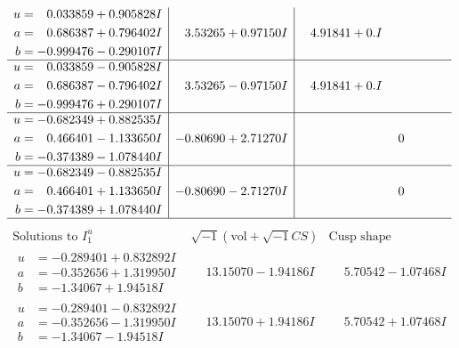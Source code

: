 \documentclass[1p]{elsarticle_modified}
\theoremstyle{definition}
\newcommand{\I}{\sqrt{-1}}
\begin{document}
$$\begin{array}{c|c|c}
\begin{aligned}
u &= \phantom{-}0.033859 + 0.905828 I \\
a &= \phantom{-}0.686387 + 0.796402 I \\
b &= -0.999476 - 0.290107 I\end{aligned}
 & \phantom{-}3.53265 + 0.97150 I & \phantom{-}4.91841 + 0. I\phantom{ +0.000000I} \\ \hline\begin{aligned}
u &= \phantom{-}0.033859 - 0.905828 I \\
a &= \phantom{-}0.686387 - 0.796402 I \\
b &= -0.999476 + 0.290107 I\end{aligned}
 & \phantom{-}3.53265 - 0.97150 I & \phantom{-}4.91841 + 0. I\phantom{ +0.000000I} \\ \hline\begin{aligned}
u &= -0.682349 + 0.882535 I \\
a &= \phantom{-}0.466401 - 1.133650 I \\
b &= -0.374389 - 1.078440 I\end{aligned}
 & -0.80690 + 2.71270 I & \phantom{-0.000000 } 0 \\ \hline\begin{aligned}
u &= -0.682349 - 0.882535 I \\
a &= \phantom{-}0.466401 + 1.133650 I \\
b &= -0.374389 + 1.078440 I\end{aligned}
 & -0.80690 - 2.71270 I & \phantom{-0.000000 } 0\\
 \hline 
 \end{array}$$\newpage$$\begin{array}{c|c|c}  
\text{Solutions to }I^u_{1}& \I (\text{vol} + \sqrt{-1}CS) & \text{Cusp shape}\\
 \hline 
\begin{aligned}
u &= -0.289401 + 0.832892 I \\
a &= -0.352656 + 1.319950 I \\
b &= -1.34067 + 1.94518 I\end{aligned}
 & \phantom{-}13.15070 - 1.94186 I & \phantom{-}5.70542 - 1.07468 I \\ \hline\begin{aligned}
u &= -0.289401 - 0.832892 I \\
a &= -0.352656 - 1.319950 I \\
b &= -1.34067 - 1.94518 I\end{aligned}
 & \phantom{-}13.15070 + 1.94186 I & \phantom{-}5.70542 + 1.07468 I \\ \hline\begin{aligned}

\end{aligned}
\end{array}$$
\end{document}
